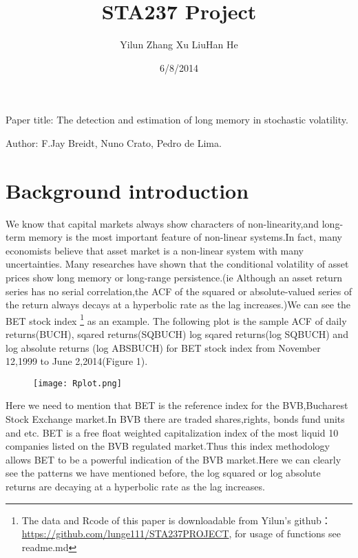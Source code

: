 \documentclass[10pt,a4paper]{article}
\title{\huge STA237 Project}
\date{6/8/2014}
\author[1]{Yilun Zhang \qquad  Xu Liu\qquad Han He}
\begin{document}
\maketitle
\begin{center} Paper title: The detection and estimation of long memory in stochastic volatility.\end{center}

\begin{center} Author: F.Jay Breidt, Nuno Crato, Pedro de Lima.\end{center}

\section{Background introduction}

We know that capital markets always show characters of non-linearity,and long-term memory is the most important feature of non-linear systems.In fact, many economists believe that asset market is a non-linear system with many uncertainties. Many researches have shown that the conditional volatility of asset prices show long memory or long-range persistence.(ie Although an asset return series has no serial correlation,the ACF of the squared or absolute-valued series of the return always decays at a hyperbolic rate as the lag increases.)We can see the BET stock index  \footnote[1]{The data and Rcode of this paper is downloadable from Yilun's github： \url{https://github.com/lunge111/STA237PROJECT}, for usage of functions see readme.md} as an example. The following plot is the sample ACF of daily returns(BUCH), sqared returns(SQBUCH) log sqared returns(log SQBUCH) and log absolute returns (log ABSBUCH) for BET stock index from November 12,1999 to June 2,2014(Figure 1).

\begin{figure}[!htbp]
\centering
\texttt{[image: Rplot.png]}
\caption{}
\end{figure}



Here we need to mention that BET is the reference index for the BVB,Bucharest Stock Exchange market.In BVB  there are traded shares,rights, bonds fund units and etc. BET is a free float weighted capitalization index of the most liquid 10 companies listed on the BVB regulated market.Thus this index methodology allows BET to be a powerful indication of the BVB market.Here we can clearly see the patterns we have mentioned before, the log squared or log absolute returns are decaying at a hyperbolic rate as the lag increases.
\end{document}
